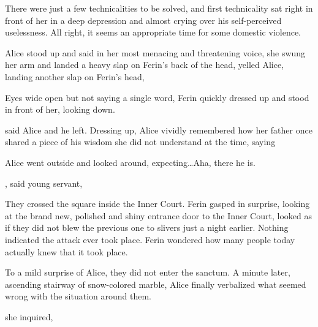There were just a few technicalities to be solved, and first technicality sat right in front of her in a deep depression and almost crying over his self-perceived uselessness. All right, it seems an appropriate time for some domestic violence. 

Alice stood up and said in her most menacing and threatening voice,  she swung her arm and landed a heavy slap on Ferin's back of the head,  yelled Alice, landing another slap on Ferin's head, 

Eyes wide open but not saying a single word, Ferin quickly dressed up and stood in front of her, looking down.

 said Alice and he left. Dressing up, Alice vividly remembered how her father once shared a piece of his wisdom she did not understand at the time, saying 

Alice went outside and looked around, expecting\dots Aha, there he is. 

, said young servant, 

They crossed the square inside the Inner Court. Ferin gasped in surprise, looking at the brand new, polished and shiny entrance door to the Inner Court, looked as if they did not blew the previous one to slivers just a night earlier. Nothing indicated the attack ever took place. Ferin wondered how many people today actually knew that it took place.

To a mild surprise of Alice, they did not enter the sanctum. A minute later, ascending stairway of snow-colored marble, Alice finally verbalized what seemed wrong with the situation around them.

 she inquired, 

